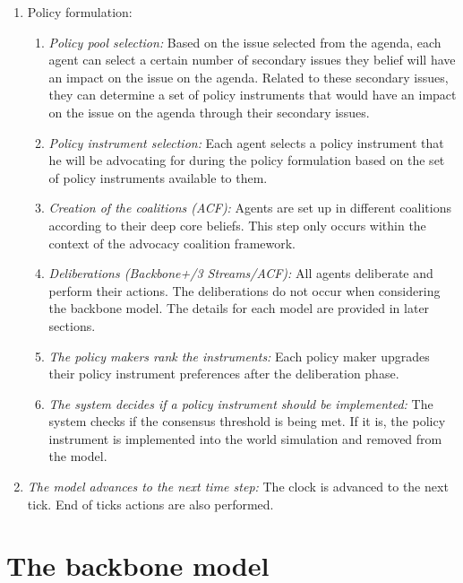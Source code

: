 \begin{enumerate}
\item Policy formulation:

	\begin{enumerate}
	\item \emph{Policy pool selection:} Based on the issue selected from the agenda, each agent can select a certain number of secondary issues they belief will have an impact on the issue on the agenda. Related to these secondary issues, they can determine a set of policy instruments that would have an impact on the issue on the agenda through their secondary issues. 
	\item \emph{Policy instrument selection:} Each agent selects a policy instrument that he will be advocating for during the policy formulation based on the set of policy instruments available to them.
	\item \emph{Creation of the coalitions (ACF):} Agents are set up in different coalitions according to their deep core beliefs. This step only occurs within the context of the advocacy coalition framework.
	\item \emph{Deliberations (Backbone+/3 Streams/ACF):} All agents deliberate and perform their actions. The deliberations do not occur when considering the backbone model. The details for each model are provided in later sections.
	\item \emph{The policy makers rank the instruments:} Each policy maker upgrades their policy instrument preferences after the deliberation phase.
	\item \emph{The system decides if a policy instrument should be implemented:} The system checks if the consensus threshold is being met. If it is, the policy instrument is implemented into the world simulation and removed from the model.
	\end{enumerate}
	
\item \emph{The model advances to the next time step:} The clock is advanced to the next tick. End of ticks actions are also performed.

\end{enumerate}



\section{The backbone model}

